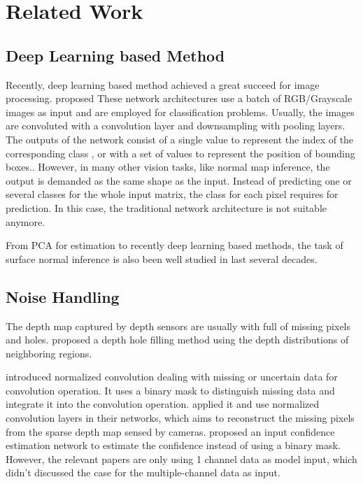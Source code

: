 
\chapter{Related Work} %

\label{ch:02} %

\section{Deep Learning based Method}

Recently, deep learning based method achieved a great succeed for image processing.  \cite{yolov3} proposed  \cite{efficientDet} These network architectures use a batch of RGB/Grayscale images as input and are employed for classification problems. Usually, the images are convoluted with a convolution layer and downsampling with pooling layers. The outputs of the network consist of a single value to represent the index of the corresponding class \cite{efficientDet}, or with a set of values to represent the position of bounding boxes.\cite{yolov3}. However, in many other vision tasks, like normal map inference, the output is demanded as the same shape as the input. Instead of predicting one or several classes for the whole input matrix, the class for each pixel requires for prediction. In this case, the traditional network architecture is not suitable anymore.

From PCA for estimation to recently deep learning based methods, the task of surface normal inference is also been well studied in last several decades. 





\section{Noise Handling}
The depth map captured by depth sensors are usually with full of missing pixels and holes.
\cite{depth-inpainting-distribution} proposed a depth hole filling method using the depth distributions of neighboring regions. 

\cite{nconv} introduced normalized convolution dealing with missing or uncertain data for convolution operation. It uses a binary mask to distinguish missing data and integrate it into the convolution operation. \cite{ncnn} applied it and use normalized convolution layers in their networks, which aims to reconstruct the missing pixels from the sparse depth map sensed by cameras. \cite{pncnn} proposed an input confidence estimation network to estimate the confidence instead of using a binary mask. However, the relevant papers are only using 1 channel data as model input, which didn't discussed the case for the multiple-channel data as input.

